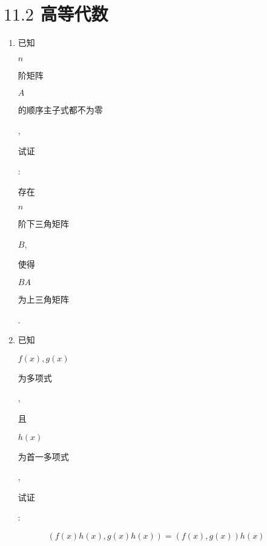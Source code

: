 \documentclass[10pt]{article}
\begin{document}
\section{$11.2$ 高等代数}
\begin{enumerate}
  \item \begin{CJK}{UTF8}{mj}已知\end{CJK} $n$ \begin{CJK}{UTF8}{mj}阶矩阵\end{CJK} $A$ \begin{CJK}{UTF8}{mj}的顺序主子式都不为零\end{CJK}, \begin{CJK}{UTF8}{mj}试证\end{CJK}: \begin{CJK}{UTF8}{mj}存在\end{CJK} $n$ \begin{CJK}{UTF8}{mj}阶下三角矩阵\end{CJK} $B$, \begin{CJK}{UTF8}{mj}使得\end{CJK} $B A$ \begin{CJK}{UTF8}{mj}为上三角矩阵\end{CJK}.

  \item \begin{CJK}{UTF8}{mj}已知\end{CJK} $f(x), g(x)$ \begin{CJK}{UTF8}{mj}为多项式\end{CJK}, \begin{CJK}{UTF8}{mj}且\end{CJK} $h(x)$ \begin{CJK}{UTF8}{mj}为首一多项式\end{CJK}, \begin{CJK}{UTF8}{mj}试证\end{CJK}:

\end{enumerate}
$$
(f(x) h(x), g(x) h(x))=(f(x), g(x)) h(x)
$$
\end{document}
